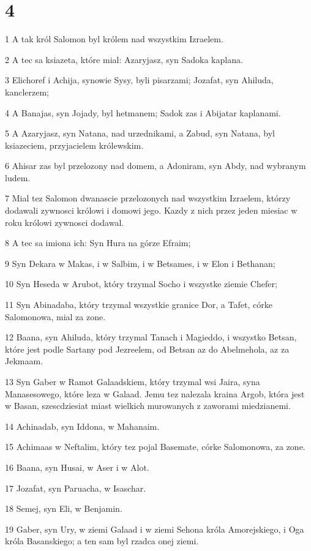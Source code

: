 \chapter{4}

\par 1 A tak król Salomon byl królem nad wszystkim Izraelem.
\par 2 A tec sa ksiazeta, które mial: Azaryjasz, syn Sadoka kaplana.
\par 3 Elichoref i Achija, synowie Sysy, byli pisarzami; Jozafat, syn Ahiluda, kanclerzem;
\par 4 A Banajas, syn Jojady, byl hetmanem; Sadok zas i Abijatar kaplanami.
\par 5 A Azaryjasz, syn Natana, nad urzednikami, a Zabud, syn Natana, byl ksiazeciem, przyjacielem królewskim.
\par 6 Ahisar zas byl przelozony nad domem, a Adoniram, syn Abdy, nad wybranym ludem.
\par 7 Mial tez Salomon dwanascie przelozonych nad wszystkim Izraelem, którzy dodawali zywnosci królowi i domowi jego. Kazdy z nich przez jeden miesiac w roku królowi zywnosci dodawal.
\par 8 A tec sa imiona ich: Syn Hura na górze Efraim;
\par 9 Syn Dekara w Makas, i w Salbim, i w Betsames, i w Elon i Bethanan;
\par 10 Syn Heseda w Arubot, który trzymal Socho i wszystke ziemie Chefer;
\par 11 Syn Abinadaba, który trzymal wszystkie granice Dor, a Tafet, córke Salomonowa, mial za zone.
\par 12 Baana, syn Ahiluda, który trzymal Tanach i Magieddo, i wszystko Betsan, które jest podle Sartany pod Jezreelem, od Betsan az do Abelmehola, az za Jekmaam.
\par 13 Syn Gaber w Ramot Galaadskiem, który trzymal wsi Jaira, syna Manasesowego, które leza w Galaad. Jemu tez nalezala kraina Argob, która jest w Basan, szescdziesiat miast wielkich murowanych z zaworami miedzianemi.
\par 14 Achinadab, syn Iddona, w Mahanaim.
\par 15 Achimaas w Neftalim, który tez pojal Basemate, córke Salomonowa, za zone.
\par 16 Baana, syn Husai, w Aser i w Alot.
\par 17 Jozafat, syn Paruacha, w Isaschar.
\par 18 Semej, syn Eli, w Benjamin.
\par 19 Gaber, syn Ury, w ziemi Galaad i w ziemi Sehona króla Amorejskiego, i Oga króla Basanskiego; a ten sam byl rzadca onej ziemi.
